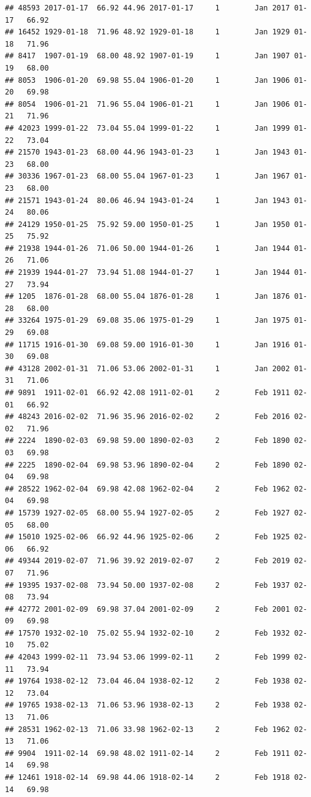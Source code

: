\documentclass{article}\usepackage[]{graphicx}\usepackage[]{color}
\makeatletter
\newenvironment{kframe}{%
 \def\at@end@of@kframe{}%
 \ifinner\ifhmode%
  \def\at@end@of@kframe{\end{minipage}}%
  \begin{minipage}{\columnwidth}%
 \fi\fi%
 \def\FrameCommand##1{\hskip\@totalleftmargin \hskip-\fboxsep
 \colorbox{shadecolor}{##1}\hskip-\fboxsep
     \hskip-\linewidth \hskip-\@totalleftmargin \hskip\columnwidth}%
 \MakeFramed {\advance\hsize-\width
   \@totalleftmargin\z@ \linewidth\hsize
   \@setminipage}}%
 {\par\unskip\endMakeFramed%
 \at@end@of@kframe}
\newenvironment{knitrout}{}{} %
\makeatother
\begin{document}
\begin{knitrout}
\begin{kframe}
\begin{verbatim}
## 48593 2017-01-17  66.92 44.96 2017-01-17     1        Jan 2017 01-17   66.92
## 16452 1929-01-18  71.96 48.92 1929-01-18     1        Jan 1929 01-18   71.96
## 8417  1907-01-19  68.00 48.92 1907-01-19     1        Jan 1907 01-19   68.00
## 8053  1906-01-20  69.98 55.04 1906-01-20     1        Jan 1906 01-20   69.98
## 8054  1906-01-21  71.96 55.04 1906-01-21     1        Jan 1906 01-21   71.96
## 42023 1999-01-22  73.04 55.04 1999-01-22     1        Jan 1999 01-22   73.04
## 21570 1943-01-23  68.00 44.96 1943-01-23     1        Jan 1943 01-23   68.00
## 30336 1967-01-23  68.00 55.04 1967-01-23     1        Jan 1967 01-23   68.00
## 21571 1943-01-24  80.06 46.94 1943-01-24     1        Jan 1943 01-24   80.06
## 24129 1950-01-25  75.92 59.00 1950-01-25     1        Jan 1950 01-25   75.92
## 21938 1944-01-26  71.06 50.00 1944-01-26     1        Jan 1944 01-26   71.06
## 21939 1944-01-27  73.94 51.08 1944-01-27     1        Jan 1944 01-27   73.94
## 1205  1876-01-28  68.00 55.04 1876-01-28     1        Jan 1876 01-28   68.00
## 33264 1975-01-29  69.08 35.06 1975-01-29     1        Jan 1975 01-29   69.08
## 11715 1916-01-30  69.08 59.00 1916-01-30     1        Jan 1916 01-30   69.08
## 43128 2002-01-31  71.06 53.06 2002-01-31     1        Jan 2002 01-31   71.06
## 9891  1911-02-01  66.92 42.08 1911-02-01     2        Feb 1911 02-01   66.92
## 48243 2016-02-02  71.96 35.96 2016-02-02     2        Feb 2016 02-02   71.96
## 2224  1890-02-03  69.98 59.00 1890-02-03     2        Feb 1890 02-03   69.98
## 2225  1890-02-04  69.98 53.96 1890-02-04     2        Feb 1890 02-04   69.98
## 28522 1962-02-04  69.98 42.08 1962-02-04     2        Feb 1962 02-04   69.98
## 15739 1927-02-05  68.00 55.94 1927-02-05     2        Feb 1927 02-05   68.00
## 15010 1925-02-06  66.92 44.96 1925-02-06     2        Feb 1925 02-06   66.92
## 49344 2019-02-07  71.96 39.92 2019-02-07     2        Feb 2019 02-07   71.96
## 19395 1937-02-08  73.94 50.00 1937-02-08     2        Feb 1937 02-08   73.94
## 42772 2001-02-09  69.98 37.04 2001-02-09     2        Feb 2001 02-09   69.98
## 17570 1932-02-10  75.02 55.94 1932-02-10     2        Feb 1932 02-10   75.02
## 42043 1999-02-11  73.94 53.06 1999-02-11     2        Feb 1999 02-11   73.94
## 19764 1938-02-12  73.04 46.04 1938-02-12     2        Feb 1938 02-12   73.04
## 19765 1938-02-13  71.06 53.96 1938-02-13     2        Feb 1938 02-13   71.06
## 28531 1962-02-13  71.06 33.98 1962-02-13     2        Feb 1962 02-13   71.06
## 9904  1911-02-14  69.98 48.02 1911-02-14     2        Feb 1911 02-14   69.98
## 12461 1918-02-14  69.98 44.06 1918-02-14     2        Feb 1918 02-14   69.98

\end{verbatim}
\end{kframe}
\end{knitrout}
\end{document}
